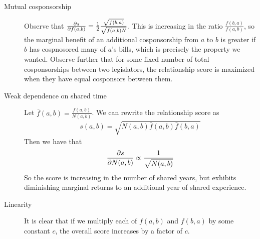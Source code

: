 \documentclass{article}
\begin{document}
\begin{description}
    \item[Mutual cosponsorship] Observe that $\frac{\partial s}{\partial f(a, b)} = \frac{1}{2} \frac{\sqrt{f(b, a)}}{\sqrt{f(a, b) N}}$. This is increasing in the ratio $\frac{f(b, a)}{f(a, b)}$, so the marginal benefit of an additional cosponsorship from $a$ to $b$ is greater if $b$ has cospnosored many of $a$'s bills, which is precisely the property we wanted. Observe further that for some fixed number of total cosponsorships between two legislators, the relationship score is maximized when they have equal cosponsors between them. 
    \item[Weak dependence on shared time] Let $\bar{f}(a, b) = \frac{f(a, b)}{N(a, b)}$. We can rewrite the relationship score as
    \begin{align*}
        s(a, b) = \sqrt{N(a, b) \bar{f}(a, b) \bar{f}(b, a)}
    \end{align*} 
    Then we have that
    \begin{align*}
        \frac{\partial s}{\partial N(a, b)} \propto \frac{1}{\sqrt{N(a, b)}}
    \end{align*} 
    So the score is increasing in the number of shared years, but exhibits diminishing marginal returns to an additional year of shared experience. 
    \item[Linearity] It is clear that if we multiply each of $f(a, b)$ and $f(b, a)$ by some constant $c$, the overall score increases by a factor of $c$. 
\end{description}
\end{document}
